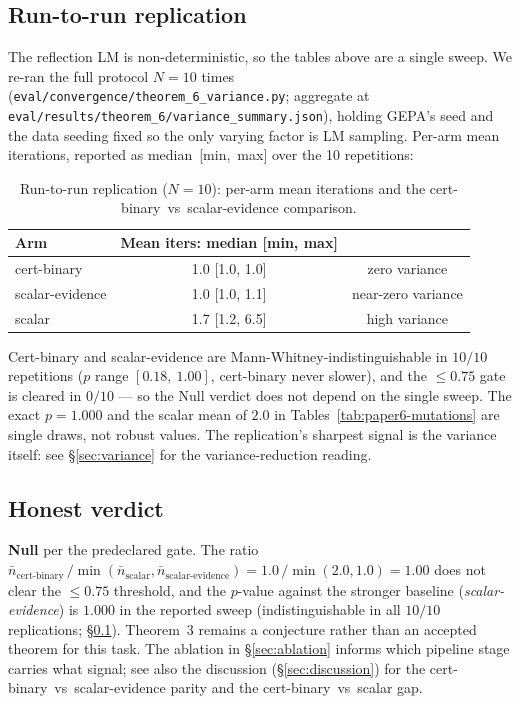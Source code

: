 \subsection{Run-to-run replication}\label{sec:results-variance}

The reflection LM is non-deterministic, so the tables above are a
single sweep.  We re-ran the full protocol $N=10$ times
(\texttt{eval/convergence/theorem\_6\_variance.py}; aggregate at
\texttt{eval/results/theorem\_6/variance\_summary.json}), holding
GEPA's seed and the data seeding fixed so the only varying factor is
LM sampling.  Per-arm mean iterations, reported as
median~[min,~max] over the 10 repetitions:

\begin{table}[h]
\caption{Run-to-run replication ($N=10$): per-arm mean iterations
and the cert-binary~vs~scalar-evidence comparison.}
\label{tab:paper6-variance}
\centering
\small
\begin{tabular}{lcc}
\toprule
Arm & Mean iters: median [min, max] & \\
\midrule
cert-binary       & 1.0 [1.0, 1.0] & zero variance \\
scalar-evidence   & 1.0 [1.0, 1.1] & near-zero variance \\
scalar            & 1.7 [1.2, 6.5] & high variance \\
\bottomrule
\end{tabular}
\end{table}

Cert-binary and scalar-evidence are Mann-Whitney-indistinguishable
in $10/10$ repetitions ($p$ range $[0.18,~1.00]$, cert-binary never
slower), and the $\le 0.75$ gate is cleared in $0/10$ --- so the Null
verdict does not depend on the single sweep.  The exact $p=1.000$ and
the scalar mean of $2.0$ in Tables~\ref{tab:paper6-mutations} are
single draws, not robust values.  The replication's sharpest signal
is the variance itself: see §\ref{sec:variance} for the
variance-reduction reading.

\subsection{Honest verdict}

\textbf{Null} per the predeclared gate.  The ratio
$\bar n_{\text{cert-binary}}\,/\min(\bar n_{\text{scalar}}, \bar
n_{\text{scalar-evidence}}) = 1.0\,/\min(2.0, 1.0) = 1.00$ does not
clear the $\le 0.75$ threshold, and the $p$-value against the
stronger baseline (\textit{scalar-evidence}) is $1.000$ in the
reported sweep (indistinguishable in all $10/10$ replications;
§\ref{sec:results-variance}).  Theorem~3
remains a conjecture rather than an accepted theorem for this task.
The ablation in §\ref{sec:ablation} informs which pipeline stage
carries what signal; see also the discussion (§\ref{sec:discussion})
for the cert-binary~vs~scalar-evidence parity and the
cert-binary~vs~scalar gap.
